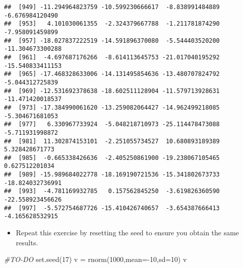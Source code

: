 \documentclass[
]{article}
\newenvironment{Shaded}{\begin{snugshade}}{\end{snugshade}}
\newcommand{\AttributeTok}[1]{\textcolor[rgb]{0.77,0.63,0.00}{#1}}
\newcommand{\CommentTok}[1]{\textcolor[rgb]{0.56,0.35,0.01}{\textit{#1}}}
\newcommand{\DecValTok}[1]{\textcolor[rgb]{0.00,0.00,0.81}{#1}}
\newcommand{\FunctionTok}[1]{\textcolor[rgb]{0.00,0.00,0.00}{#1}}
\newcommand{\NormalTok}[1]{#1}
\newcommand{\OtherTok}[1]{\textcolor[rgb]{0.56,0.35,0.01}{#1}}
\newcommand{\SpecialCharTok}[1]{\textcolor[rgb]{0.00,0.00,0.00}{#1}}
\providecommand{\tightlist}{%
  \setlength{\itemsep}{0pt}\setlength{\parskip}{0pt}}
\begin{document}
\begin{verbatim}
##  [949] -11.294964823759 -10.599230666617  -8.838991484889  -6.676984120490
##  [953]   4.101030061355  -2.324379667788  -1.211781874290  -7.958091459899
##  [957] -18.027837222519 -14.591896370080  -5.544403520200 -11.304673300288
##  [961]  -4.697687176266  -8.614113645753 -21.017040195292 -15.540833411153
##  [965] -17.468328633006 -14.131495854636 -13.480707824792  -5.044312725839
##  [969] -12.531692378638 -18.602511128904 -11.579713928631 -11.471420018537
##  [973] -17.384990061620 -13.259082064427 -14.962499218085  -5.304671681053
##  [977]   6.330967733924  -5.048218710973 -25.114478473088  -5.711931998872
##  [981]  11.302874153101  -2.251055734527  10.680893189389   5.328428671773
##  [985]  -0.665338426636  -2.405250861900 -19.238067105465   0.627512201034
##  [989] -15.989684022778 -18.169190721536 -15.341802673733 -18.824032736991
##  [993]  -4.781169932785   0.157562845250  -3.619826360590 -22.558923456626
##  [997]  -5.572754687726 -15.410426740657  -3.654387666413  -4.165628532915
\end{verbatim}

\begin{itemize}
\tightlist
\item
  Repeat this exercise by resetting the seed to ensure you obtain the
  same results.
\end{itemize}

\begin{Shaded}
\begin{Highlighting}[]
\CommentTok{\#TO{-}DO}
\FunctionTok{set.seed}\NormalTok{(}\DecValTok{17}\NormalTok{)}
\NormalTok{v }\OtherTok{=} \FunctionTok{rnorm}\NormalTok{(}\DecValTok{1000}\NormalTok{,}\AttributeTok{mean=}\SpecialCharTok{{-}}\DecValTok{10}\NormalTok{,}\AttributeTok{sd=}\DecValTok{10}\NormalTok{)}
\NormalTok{v}
\end{Highlighting}
\end{Shaded}
\end{document}
